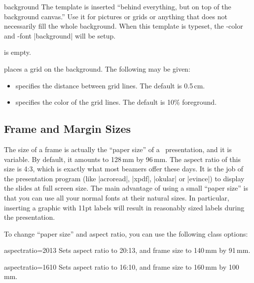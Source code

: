 \begin{element}{background}\yes\yes\yes
  The template is inserted ``behind everything, but on top of the background canvas.'' Use it for pictures or grids or anything that does not necessarily fill the whole background. When this template is typeset, the \beamer-color and -font |background| will be setup.

  \begin{templateoptions}
     is empty.

    places a grid on the background. The following  may be given:
    \begin{itemize}
      \item
       specifies the distance between grid lines. The default is 0.5\,cm.
      \item
       specifies the color of the grid lines. The default is 10\% foreground.
    \end{itemize}
  \end{templateoptions}
\end{element}


\subsection{Frame and Margin Sizes}

The size of a frame is actually the ``paper size'' of a \beamer\ presentation, and it is variable. By default, it amounts to 128\,mm by 96\,mm. The aspect ratio of this size is 4:3, which is exactly what most beamers offer these days. It is the job of the presentation program (like |acroread|, |xpdf|, |okular| or |evince|) to display the slides at full screen size. The main advantage of using a small ``paper size'' is that you can use all your normal fonts at their natural sizes. In particular, inserting a graphic with 11pt labels will result in reasonably sized labels during the presentation.

To change ``paper size'' and aspect ratio, you can use the following class options:

\begin{classoption}{aspectratio=2013}
  Sets aspect ratio to 20:13, and frame size to 140\,mm by 91\,mm.
\end{classoption}

\begin{classoption}{aspectratio=1610}
  Sets aspect ratio to 16:10, and frame size to 160\,mm by 100\,mm.
\end{classoption}

